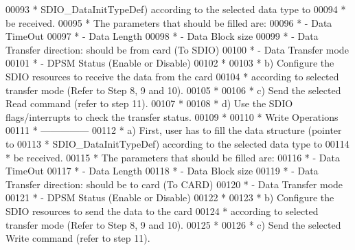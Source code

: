 \begin{DoxyCode}
00093 \textcolor{comment}{  *                 SDIO\_DataInitTypeDef) according to the selected data type to}
00094 \textcolor{comment}{  *                 be received.}
00095 \textcolor{comment}{  *                 The parameters that should be filled are:}
00096 \textcolor{comment}{  *                   - Data TimeOut}
00097 \textcolor{comment}{  *                   - Data Length}
00098 \textcolor{comment}{  *                   - Data Block size}
00099 \textcolor{comment}{  *                   - Data Transfer direction: should be from card (To SDIO)}
00100 \textcolor{comment}{  *                   - Data Transfer mode}
00101 \textcolor{comment}{  *                   - DPSM Status (Enable or Disable)}
00102 \textcolor{comment}{  *                                   }
00103 \textcolor{comment}{  *              b) Configure the SDIO resources to receive the data from the card}
00104 \textcolor{comment}{  *                 according to selected transfer mode (Refer to Step 8, 9 and 10).}
00105 \textcolor{comment}{  *}
00106 \textcolor{comment}{  *              c) Send the selected Read command (refer to step 11).}
00107 \textcolor{comment}{  *                  }
00108 \textcolor{comment}{  *              d) Use the SDIO flags/interrupts to check the transfer status.}
00109 \textcolor{comment}{  *}
00110 \textcolor{comment}{  *              Write Operations}
00111 \textcolor{comment}{  *              ---------------}
00112 \textcolor{comment}{  *              a) First, user has to fill the data structure (pointer to}
00113 \textcolor{comment}{  *                 SDIO\_DataInitTypeDef) according to the selected data type to}
00114 \textcolor{comment}{  *                 be received.}
00115 \textcolor{comment}{  *                 The parameters that should be filled are:}
00116 \textcolor{comment}{  *                   - Data TimeOut}
00117 \textcolor{comment}{  *                   - Data Length}
00118 \textcolor{comment}{  *                   - Data Block size}
00119 \textcolor{comment}{  *                   - Data Transfer direction:  should be to card (To CARD)}
00120 \textcolor{comment}{  *                   - Data Transfer mode}
00121 \textcolor{comment}{  *                   - DPSM Status (Enable or Disable)}
00122 \textcolor{comment}{  *}
00123 \textcolor{comment}{  *              b) Configure the SDIO resources to send the data to the card}
00124 \textcolor{comment}{  *                 according to selected transfer mode (Refer to Step 8, 9 and 10).}
00125 \textcolor{comment}{  *                   }
00126 \textcolor{comment}{  *              c) Send the selected Write command (refer to step 11).}

\end{DoxyCode}

